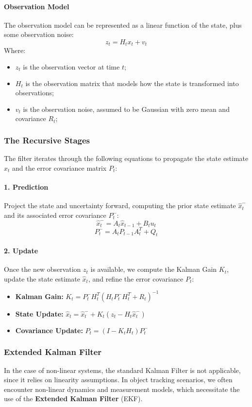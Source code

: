 \paragraph{Observation Model}
The observation model can be represented as a linear function of the state, plus some observation noise:
$$z_t = H_t x_t + v_t$$
Where:
\begin{itemize}
    \item $z_t$ is the observation vector at time $t$;
    \item $H_t$ is the observation matrix that models how the state is transformed into observations;
    \item $v_t$ is the observation noise, assumed to be Gaussian with zero mean and covariance $R_t$;
\end{itemize}

\subsubsection{The Recursive Stages}
The filter iterates through the following equations to propagate the state estimate $\hat{x}_t$ 
and the error covariance matrix $P_t$:

\paragraph{1. Prediction}
Project the state and uncertainty forward, computing the prior state estimate $\hat{x}_t^-$ 
and its associated error covariance $P_t^-$:
$$\hat{x}_t^- = A_t \hat{x}_{t-1} + B_t u_t$$
$$P_t^- = A_t P_{t-1} A_t^T + Q_t$$

\paragraph{2. Update}
Once the new observation $z_t$ is available, we compute the Kalman Gain $K_t$, update the state estimate $\hat{x}_t$,
and refine the error covariance $P_t$:
\begin{itemize}
    \item \textbf{Kalman Gain:} $K_t = P_t^- H_t^T (H_t P_t^- H_t^T + R_t)^{-1}$
    \item \textbf{State Update:} $\hat{x}_t = \hat{x}_t^- + K_t (z_t - H_t \hat{x}_t^-)$
    \item \textbf{Covariance Update:} $P_t = (I - K_t H_t) P_t^-$
\end{itemize}

\subsubsection{Extended Kalman Filter}
In the case of non-linear systems, the standard Kalman Filter is not applicable, since it relies on linearity assumptions.
In object tracking scenarios, we often encounter non-linear dynamics and measurement models, which necessitate the use of the \textbf{Extended Kalman Filter} (EKF).

